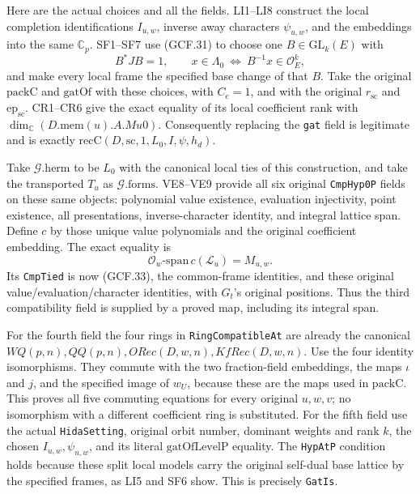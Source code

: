 Here are the actual choices and all the fields.  LI1--LI8 construct
the local completion identifications \(I_{u,w}\), inverse away
characters \(\psi_{u,w}\), and the embeddings into the same
\(\mathbb C_p\).  SF1--SF7 use (GCF.31) to choose one
\(B\in\mathrm{GL}_k(E)\) with
\[
 B^*JB=1,\qquad
 x\in\Lambda_0\ \Longleftrightarrow\ B^{-1}x\in\mathcal O_E^k,
 \tag{GCF.33}
\]
and make every local frame the specified base change of that \(B\).
Take the original \(\mathrm{packC}\) and \(\mathrm{gatOf}\)
with these choices, with \(C_e=1\), and with the original
\(r_{\mathrm{sc}}\) and \(\mathrm{ep}_{\mathrm{sc}}\).
CR1--CR6 give the exact equality of its local coefficient rank
with \(\dim_{\mathbb C}(D.\mathrm{mem}(u).A.Mu0)\).
Consequently replacing the \texttt{gat} field is legitimate and is
exactly \(\mathrm{recC}(D,\mathrm{sc},1,L_0,I,\psi,h_d)\).

Take \(\mathcal G.\mathrm{herm}\) to be \(L_0\) with the
canonical local ties of this construction, and take the transported
\(T_u\) as \(\mathcal G.\mathrm{forms}\).  VE8--VE9 provide all
six original \texttt{CmpHyp0P} fields on these same objects:
polynomial value existence, evaluation injectivity, point existence,
all presentations, inverse-character identity, and integral lattice
span.  Define \(c\) by those unique value polynomials and the
original coefficient embedding.  The exact equality is
\[
                \mathcal O_w\text{-span}\,c(\mathcal L_u)=M_{u,w}.
 \tag{GCF.34}
\]
Its \texttt{CmpTied} is now (GCF.33), the common-frame identities,
and these original value/evaluation/character identities, with
\(G_t\)'s original positions.  Thus the third compatibility field
is supplied by a proved map, including its integral span.

For the fourth field the four rings in
\texttt{RingCompatibleAt} are already the canonical
\(WQ(p,n),QQ(p,n),ORec(D,w,n),KfRec(D,w,n)\).
Use the four identity isomorphisms.  They commute with the two
fraction-field embeddings, the maps \(\iota\) and \(j\), and the
specified image of \(w_U\), because these are the maps used in
\(\mathrm{packC}\).  This proves all five commuting equations
for every original \(u,w,v\); no isomorphism with a different
coefficient ring is substituted.  For the fifth field use the actual
\texttt{HidaSetting}, original orbit number, dominant weights and
rank \(k\), the chosen \(I_{u,w},\psi_{u,w}\), and its literal
\(\mathrm{gatOfLevelP}\) equality.  The \texttt{HypAtP} condition
holds because these split local models carry the original self-dual
base lattice by the specified frames, as LI5 and SF6 show.
This is precisely \texttt{GatIs}.

